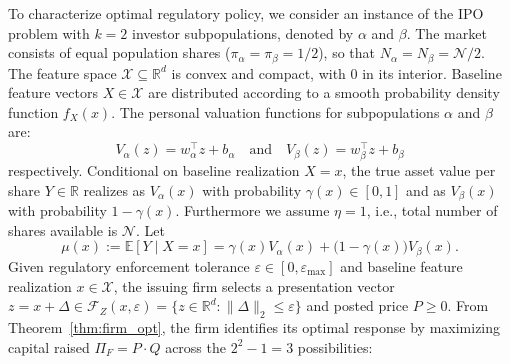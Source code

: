 To characterize optimal regulatory policy, we consider an instance of the IPO problem with $k=2$ investor subpopulations, denoted by $\alpha$ and $\beta$. The market consists of equal population shares ($\pi_\alpha = \pi_\beta = 1/2$), so that $N_\alpha = N_\beta = \mathcal{N}/2$. The feature space $\mathcal{X} \subseteq \mathbb{R}^d$ is convex and compact, with $0$ in its interior. Baseline feature vectors $X \in \mathcal{X}$ are distributed according to a smooth probability density function $f_X(x)$. The personal valuation functions for subpopulations $\alpha$ and $\beta$ are:
\begin{equation}
V_\alpha(z) = w_\alpha^\top z + b_\alpha \quad \text{and} \quad V_\beta(z) = w_\beta^\top z + b_\beta
\end{equation}
respectively. Conditional on baseline realization $X = x$, the true asset value per share $Y \in \mathbb{R}$ realizes as $V_\alpha(x)$ with probability $\gamma(x) \in [0,1]$ and as $V_\beta(x)$ with probability $1 - \gamma(x)$. Furthermore we assume $\eta = 1$, i.e., total number of shares available is $\mathcal{N}$. Let
\begin{equation}
\mu(x) := \mathbb{E}[Y \mid X = x] = \gamma(x) V_\alpha(x) + \bigl(1 - \gamma(x)\bigr) V_\beta(x).
\end{equation} Given regulatory enforcement tolerance $\varepsilon \in [0, \varepsilon_{\max}]$ and baseline feature realization $x \in \mathcal{X}$, the issuing firm selects a presentation vector $z = x + \Delta \in \mathcal{F}_Z(x, \varepsilon) = \{z \in \mathbb{R}^d : \|\Delta\|_2 \le \varepsilon\}$ and posted price $P \ge 0$. From Theorem~\ref{thm:firm_opt}, the firm identifies its optimal response by maximizing capital raised $\Pi_F = P \cdot Q$ across the $2^2 - 1 = 3$ possibilities:
